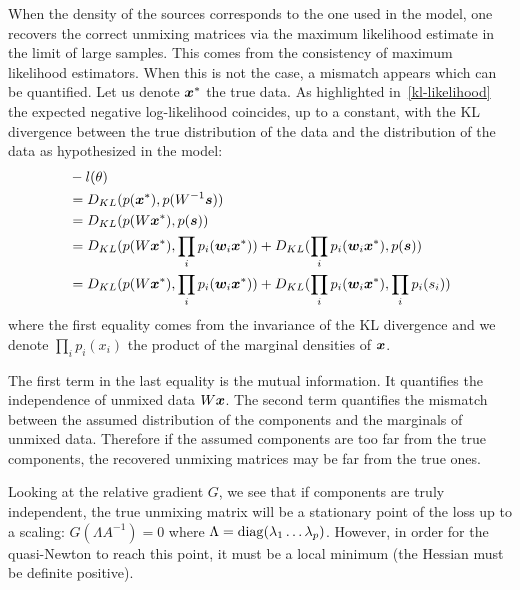 When the density of the sources corresponds to the one used in the model, one
recovers the correct unmixing matrices via the maximum likelihood estimate in the
limit of large samples. This comes from the consistency of maximum likelihood
estimators.
When this is not the case, a mismatch appears which can be quantified. Let us
denote $\boldsymbol{x}^*$ the true data. As highlighted in~\eqref{kl-likelihood} the expected
negative log-likelihood coincides, up to a constant, with the KL divergence between the true
distribution of the data and the distribution of the data as hypothesized in the
model:
\begin{align}
  &-l(\theta) \\
  &=  D_{KL}(p(\boldsymbol{x}^*), p(W^{-1} \boldsymbol{s})) \\
             &=  D_{KL}(p(W\boldsymbol{x}^*), p(\boldsymbol{s})) \\
             &=  D_{KL}(p(W \boldsymbol{x}^*), \prod_i p_i(\boldsymbol{w}_i\boldsymbol{x}^*)) + D_{KL}(\prod_i p_i(\boldsymbol{w}_i\boldsymbol{x}^*), p(\boldsymbol{s})) \\
             &=  D_{KL}(p(W \boldsymbol{x}^*), \prod_i p_i(\boldsymbol{w}_i\boldsymbol{x}^*)) + D_{KL}(\prod_i p_i(\boldsymbol{w}_i\boldsymbol{x}^*), \prod_i p_i(s_i)) \\
\end{align}
where the first equality comes from the invariance of the KL divergence and we
denote $\prod_i p_i(x_i)$ the product of the marginal densities of $\boldsymbol{x}$.

The first term in the last equality is the mutual information. It quantifies the
independence of unmixed data $W \boldsymbol{x}$. The second term quantifies the mismatch
between the assumed distribution of the components and the marginals of unmixed data.
Therefore if the assumed components are too far from the true components, the
recovered unmixing matrices may be far from the true ones.


Looking at the relative gradient $G$, we see that if components are truly
independent, the true unmixing matrix will be a stationary point of the loss up
to a scaling: $G(\Lambda A^{-1})=0$ where $\Lambda=\operatorname*{diag}(\lambda_1 \dots \lambda_p)$.
However, in order for the quasi-Newton to reach this point, it must be a local
minimum (the Hessian must be definite positive). 


